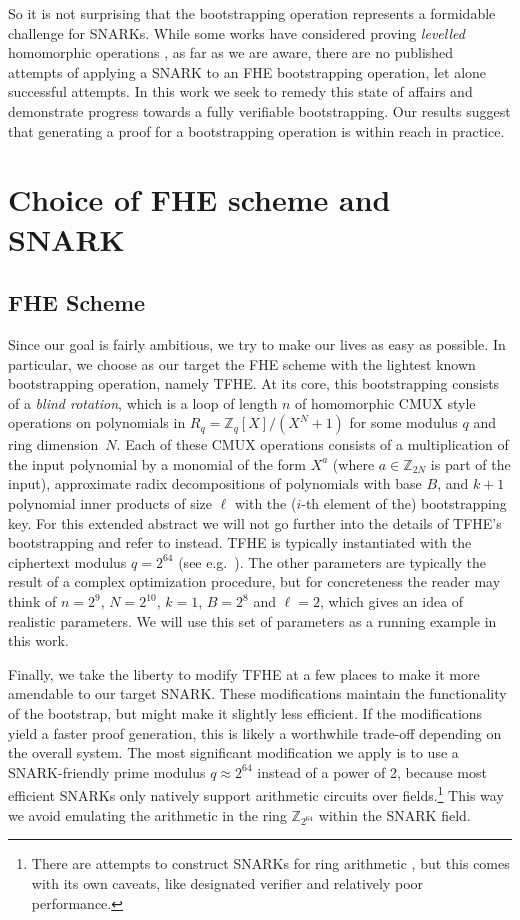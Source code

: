 \documentclass[9pt]{extarticle}
\newcommand{\ints}{\mathds{Z}}
\begin{document}
So it is not surprising that the bootstrapping operation represents a formidable challenge for SNARKs. While some works have considered proving \emph{levelled} homomorphic operations \cite{viand2023verifiable,EPRINT:GanNitSor21}, as far as we are aware, there are no published attempts of applying a SNARK to an FHE bootstrapping operation, let alone successful attempts. In this work we seek to remedy this state of affairs and demonstrate progress towards a fully verifiable bootstrapping. Our results suggest that generating a proof for a bootstrapping operation is within reach in practice.

\section{Choice of FHE scheme and SNARK}
\label{sec:fhe_snark}

\subsection{FHE Scheme}
\label{sec:fhe}


Since our goal is fairly ambitious, we try to make our lives as easy as possible. In particular, we choose as our target the FHE scheme with the lightest known bootstrapping operation, namely TFHE. At its core, this bootstrapping consists of a \emph{blind rotation}, which is a loop of length $n$ of homomorphic CMUX style operations on polynomials in $R_q = \ints_q[X] / (X^N + 1)$ for some modulus $q$ and ring dimension~$N$. Each of these CMUX operations consists of a multiplication of the input polynomial by a monomial of the form $X^a$ (where $a \in \ints_{2N}$ is part of the input), approximate radix decompositions of polynomials with base $B$, and $k + 1$ polynomial inner products of size $\ell$ with the ($i$-th element of the) bootstrapping key. For this extended abstract we will not go further into the details of TFHE's bootstrapping and refer to \cite{JC:CGGI20,AC:CLOT21,EPRINT:BBBCLOT22} instead. TFHE is typically instantiated with the ciphertext modulus $q=2^{64}$ (see e.g.\ \cite{AC:CGGI16,TFHE-rs}). The other parameters are typically the result of a complex optimization procedure, but for concreteness the reader may think of $n = 2^9$, $N=2^{10}$, $k=1$, $B = 2^8$ and $\ell=2$, which gives an idea of realistic parameters. We will use this set of parameters as a running example in this work.

Finally, we take the liberty to modify TFHE at a few places to make it more amendable to our target SNARK. These modifications maintain the functionality of the bootstrap, but might make it slightly less efficient. If the modifications yield a faster proof generation, this is likely a worthwhile trade-off depending on the overall system. The most significant modification we apply is to use a SNARK-friendly prime modulus $q \approx 2^{64}$ instead of a power of 2, because most efficient SNARKs only natively support arithmetic circuits over fields.\footnote{There are attempts to construct SNARKs for ring arithmetic \cite{EPRINT:GanNitSor21}, but this comes with its own caveats, like designated verifier and relatively poor performance.} This way we avoid emulating the arithmetic in the ring $\ints_{2^{64}}$ within the SNARK field. 
\end{document}
